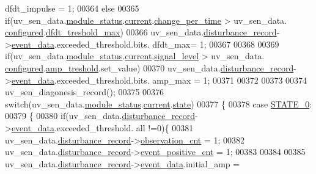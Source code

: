 \begin{DoxyCode}
      dfdt\_impulse = 1;
00364     \textcolor{keywordflow}{else}
00365     \textcolor{keywordflow}{if}(uv\_sen\_data.\hyperlink{a00035_a5a53c391562b059eb744ac679f3765ca}{module\_status}.\hyperlink{a00017_ab8af48cdbba92b3ae39c4470e53af944}{current}.\hyperlink{a00017_ad5c4f9a39d2a36632a53205ae8eb5a5d}{change\_per\_time}  > uv\_sen\_data.
      \hyperlink{a00035_a94b2d1f6ea4ab334c74d24984dd27843}{configured}.\hyperlink{a00021_adf9a37828e447378b1d533185213316d}{dfdt\_treshold\_max})
00366          uv\_sen\_data.\hyperlink{a00035_ac9b38e2c1d3f1013a88d33506c754152}{disturbance\_record}->\hyperlink{a00028_a8c0bda69e71ef674e60da47ad0be9ab0}{event\_data}.exceeded\_threshold.bits.
      dfdt\_max= 1;
00367 
00368 
00369     \textcolor{keywordflow}{if}(uv\_sen\_data.\hyperlink{a00035_a5a53c391562b059eb744ac679f3765ca}{module\_status}.\hyperlink{a00017_ab8af48cdbba92b3ae39c4470e53af944}{current}.\hyperlink{a00017_abcdf2bc0c2e5a14863938ae28c3bc96e}{signal\_level} > uv\_sen\_data.
      \hyperlink{a00035_a94b2d1f6ea4ab334c74d24984dd27843}{configured}.\hyperlink{a00021_a4b3bbfb0267daea1432f2603825ade62}{amp\_treshold}.set\_value)
00370         uv\_sen\_data.\hyperlink{a00035_ac9b38e2c1d3f1013a88d33506c754152}{disturbance\_record}->\hyperlink{a00028_a8c0bda69e71ef674e60da47ad0be9ab0}{event\_data}.exceeded\_threshold.bits.
      amp\_max = 1;
00371 
00372 
00373 
00374    uv\_sen\_diagonesis\_record();
00375 
00376     \textcolor{keywordflow}{switch}(uv\_sen\_data.\hyperlink{a00035_a5a53c391562b059eb744ac679f3765ca}{module\_status}.\hyperlink{a00017_ab8af48cdbba92b3ae39c4470e53af944}{current}.\hyperlink{a00017_a6b8d8e916bc56265a3fd279bd26b6d1b}{state})
00377     \{
00378         \textcolor{keywordflow}{case} \hyperlink{a00021_ad6739dbbe5581cac99b7dc8a5e09949c}{STATE\_0}:
00379         \{
00380             \textcolor{keywordflow}{if}(uv\_sen\_data.\hyperlink{a00035_ac9b38e2c1d3f1013a88d33506c754152}{disturbance\_record}->\hyperlink{a00028_a8c0bda69e71ef674e60da47ad0be9ab0}{event\_data}.exceeded\_threshold.
      all !=0)\{
00381             uv\_sen\_data.\hyperlink{a00035_ac9b38e2c1d3f1013a88d33506c754152}{disturbance\_record}->\hyperlink{a00028_ad5b0bac02ce266b91b2b52a1c3ea1d78}{observation\_cnt}    = 1;
00382             uv\_sen\_data.\hyperlink{a00035_ac9b38e2c1d3f1013a88d33506c754152}{disturbance\_record}->\hyperlink{a00028_a7397b9d76d4b57500f27bb23d258a18a}{event\_positive\_cnt} = 1;
00383 
00384 
00385                   uv\_sen\_data.\hyperlink{a00035_ac9b38e2c1d3f1013a88d33506c754152}{disturbance\_record}->\hyperlink{a00028_a8c0bda69e71ef674e60da47ad0be9ab0}{event\_data}.initial\_amp =

\end{DoxyCode}
